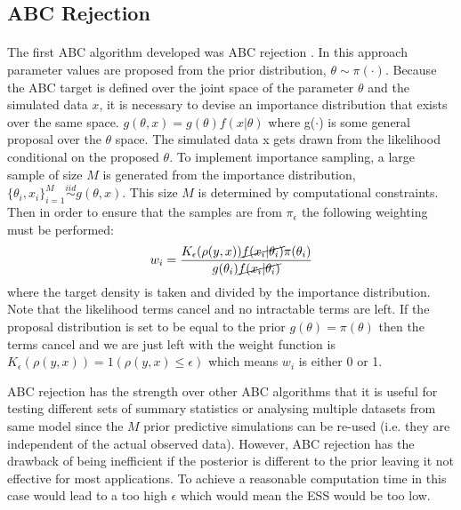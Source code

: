 \documentclass[12,fleqn]{article}
\theoremstyle{definition}
\theoremstyle{plain}
\begin{document}
\subsection{ABC Rejection}
\paragraph{}
The first ABC algorithm developed was ABC rejection \cite{Beaumont}. In this approach parameter values are proposed from the prior distribution, $\theta \sim \pi(\cdot)$. Because the ABC target is defined over the joint space of the parameter $\theta$ and the simulated data $x$, it is necessary to devise an importance distribution that exists over the same space.
$ g(\theta, x) = g(\theta)f(x|\theta)$
where g($\cdot$) is some general proposal over the $\theta$ space. The simulated data x gets drawn from the likelihood conditional on the proposed $\theta$. To implement importance sampling, a large sample of size $M$ is generated from the importance distribution, $ \{\theta_i, x_i\}^M_{i=1} \overset{iid}{\sim} g(\theta, x)$. This size $M$ is determined by computational constraints. Then in order to ensure that the samples are from $\pi_\epsilon$ the following weighting must be performed:
\begin{equation*}
w_i = \frac{K_\epsilon(\rho(y,x)) \cancel{f(x_i | \theta_i)} \pi(\theta_i)}{g(\theta_i)\cancel{f(x_i | \theta_i)}}
\end{equation*}
where the target density is taken and divided by the importance distribution. Note that the likelihood terms cancel and no intractable terms are left.
If the proposal distribution is set to be equal to the prior $g(\theta) = \pi(\theta)$ then the terms cancel and we are just left with the weight function is $K_\epsilon(\rho(y,x)) = 1(\rho(y,x) \leq \epsilon)$ which means $w_i$ is either 0 or 1.

\hfill\break
ABC rejection has the strength over other ABC algorithms that it is useful for testing different sets of summary statistics \cite{nunes} or analysing multiple datasets from same model since the $M$ prior predictive simulations can be re-used (i.e. they are independent of the actual observed data). However, ABC rejection has the drawback of being inefficient if the posterior is different to the prior leaving it not effective for most applications. To achieve a reasonable computation time in this case would lead to a too high $\epsilon$ which would mean the ESS would be too low. 
\par
\end{document}
